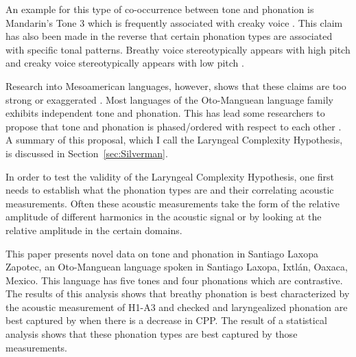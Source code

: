\documentclass[12pt, letterpaper]{article}
\begin{document}
An example for this type of co-occurrence between tone and phonation is Mandarin's Tone 3 which is frequently associated with creaky voice \citep{hockettPeipingPhonology1947,}. This claim has also been made in the reverse that certain phonation types are associated with specific tonal patterns. Breathy voice stereotypically appears with high pitch and creaky voice stereotypically appears with low pitch \citep{eslingVoiceQualityLaryngeal2019}.

Research into Mesoamerican languages, however, shows that these claims are too strong or exaggerated \citep{suarezMesoamericanIndianLanguages1983,campbellMesoAmericaLinguisticArea1986,silvermanLaryngealComplexityOtomanguean1997,dicanioPhoneticsPhonologySan2008,espositoVariationContrastivePhonation2010, campbellOtomangueanHistoricalLinguistics2017a,campbellOtomangueanHistoricalLinguistics2017}. 
Most languages of the Oto-Manguean language family exhibits independent tone and phonation. This has lead some researchers to propose that tone and phonation is phased/ordered with respect to each other \citep{silvermanLaryngealComplexityOtomanguean1997,blankenshipTimeCourseBreathiness1997,blankenshipTimingNonmodalPhonation2002}. A summary of this proposal, which I call the Laryngeal Complexity Hypothesis, is discussed in Section~\ref{sec:Silverman}. 

In order to test the validity of the Laryngeal Complexity Hypothesis, one first needs to establish what the phonation types are and their correlating acoustic measurements. Often these acoustic measurements take the form of the relative amplitude of different harmonics in the acoustic signal or by looking at the relative amplitude in the certain domains. 

This paper presents novel data on tone and phonation in Santiago Laxopa Zapotec, an Oto-Manguean language spoken in Santiago Laxopa, Ixtlán, Oaxaca, Mexico. This language has five tones and four phonations which are contrastive. The results of this analysis shows that breathy phonation is best characterized by the acoustic measurement of H1-A3 and checked and laryngealized phonation are best captured by when there is a decrease in CPP. The result of a statistical analysis shows that these phonation types are best captured by those measurements.

\end{document}
